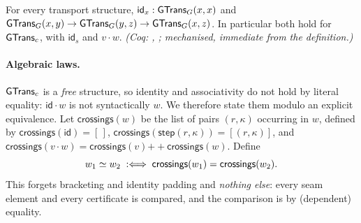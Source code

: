 \begin{thm}\label{thm:refl}
For every transport structure, $\mathsf{id}_x : \mathsf{GTrans}_G(x,x)$ and $\mathsf{GTrans}_G(x,y) \to \mathsf{GTrans}_G(y,z) \to \mathsf{GTrans}_G(x,z)$. In particular both hold for $\mathsf{GTrans}_c$, with $\mathsf{id}_s$ and $v \cdot w$. \emph{(Coq: , ; mechanised, immediate from the definition.)}
\end{thm}

\paragraph{Algebraic laws.}
$\mathsf{GTrans}_c$ is a \emph{free} structure, so identity and associativity do not hold by literal equality: $\mathsf{id} \cdot w$ is not syntactically $w$. We therefore state them modulo an explicit equivalence. Let $\mathsf{crossings}(w)$ be the list of pairs $(r,\kappa)$ occurring in $w$, defined by $\mathsf{crossings}(\mathsf{id}) = [\,]$, $\mathsf{crossings}(\mathsf{step}(r,\kappa)) = [(r,\kappa)]$, and $\mathsf{crossings}(v \cdot w) = \mathsf{crossings}(v) \mathbin{+\!\!+} \mathsf{crossings}(w)$. Define
\[
w_1 \mathrel{\simeq} w_2 \;:\Longleftrightarrow\; \mathsf{crossings}(w_1) = \mathsf{crossings}(w_2).
\]
This forgets bracketing and identity padding and \emph{nothing else}: every seam element and every certificate is compared, and the comparison is by (dependent) equality.


